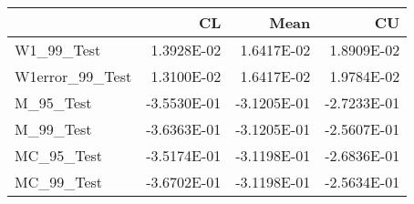 \begin{tabular}{lrrr}
\toprule
{} &          CL &        Mean &          CU \\
\midrule
W1\_99\_Test      &  1.3928E-02 &  1.6417E-02 &  1.8909E-02 \\
W1error\_99\_Test &  1.3100E-02 &  1.6417E-02 &  1.9784E-02 \\
M\_95\_Test       & -3.5530E-01 & -3.1205E-01 & -2.7233E-01 \\
M\_99\_Test       & -3.6363E-01 & -3.1205E-01 & -2.5607E-01 \\
MC\_95\_Test      & -3.5174E-01 & -3.1198E-01 & -2.6836E-01 \\
MC\_99\_Test      & -3.6702E-01 & -3.1198E-01 & -2.5634E-01 \\
\bottomrule
\end{tabular}
